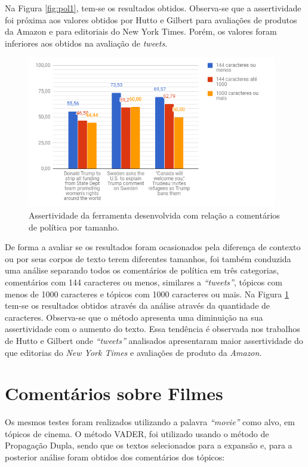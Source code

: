 Na Figura \ref{fig:pol1}, tem-se os resultados obtidos. Observa-se que
a assertividade foi próxima aos valores obtidos por Hutto e Gilbert
\cite{conf/icwsm/HuttoG14} para avaliações de produtos da Amazon e para
editoriais do New York Times. Porém, os valores foram inferiores aos obtidos na
avaliação de \textit{tweets}. 

\begin{figure}[!htbp]
\centering
\includegraphics[height=250px]{imagens/politica2.png}
\caption{Assertividade da ferramenta desenvolvida com relação a comentários de
política por tamanho.}
\label{fig:pol2}
\end{figure}

\newpage 


De forma a
avaliar se os resultados foram ocasionados pela diferença de contexto ou por seus corpos de texto terem diferentes tamanhos, foi também conduzida uma análise separando todos os comentários de política em três categorias, comentários com 144 caracteres ou
menos, similares a \textit{``tweets''}, tópicos com menos de 1000 caracteres e
tópicos com 1000 caracteres ou mais. Na Figura \ref{fig:pol2} tem-se os
resultados obtidos através da análise através da quantidade de caracteres.
Observa-se que o método apresenta uma diminuição na sua assertividade com o
aumento do texto. Essa tendência é observada nos
trabalhos de Hutto e Gilbert \cite{conf/icwsm/HuttoG14} onde \textit{``tweets''}
analisados apresentaram maior assertividade do que editorias do \textit{New
York Times} e avaliações de produto da \textit{Amazon}.

\section{Comentários sobre Filmes}

Os mesmos testes foram realizados utilizando a palavra \textit{``movie''} como
alvo, em tópicos de cinema. O método \ac{VADER}, foi utilizado usando o método
de Propagação Dupla, sendo que os textos selecionados para a expansão e, para a
posterior análise foram obtidos dos comentários dos tópicos:

